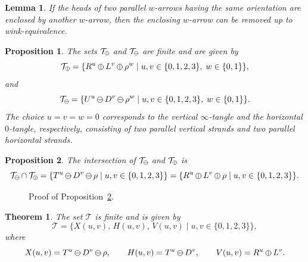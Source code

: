 \documentclass[10pt,a4paper]{amsart}
\newtheorem{lem}{Lemma}
\newtheorem{prop}{Proposition}
\newtheorem{thm}{Theorem}
\newcommand{\hstack}{
  \mathbin{
    \tikz[baseline=-0.582ex]
      \draw[line width=.1ex, line cap=round]
        (0,0) circle (.75ex)
        (-.5ex,0) -- (.5ex,0);
  }
}
\newcommand{\subhstack}{
  \mathbin{
    \tikz[baseline=-0.449ex]
      \draw[line width=.075ex,line cap=round]
        (0,0) circle (.5625ex)
        (-.375ex,0)--(.375ex,0);
  }
}
\newcommand{\subvstack}{
  \mathbin{
    \tikz[baseline=-0.449ex]
      \draw[line width=.075ex,line cap=round]
        (0,0) circle (.5625ex)
        (0,-.375ex)--(0,.375ex);
  }
}
\newcommand{\vstack}{
  \mathbin{
    \tikz[baseline=-0.582ex]
      \draw[line width=.1ex, line cap=round]
        (0,0) circle (.75ex)
        (0,-.5ex) -- (0,.5ex);
  }
}
\begin{document}
\begin{lem}\label{lemarrowsquareenclosed}
If the heads of two parallel $w$-arrows having the same orientation are enclosed by another $w$-arrow, then the enclosing $w$-arrow can be removed up to wink-equivalence.
\end{lem}

\begin{prop}\label{proptanglesets}
The sets $\mathcal{T}_{\subvstack}$ and $\mathcal{T}_{\subhstack}$ are finite and are given by
\[
\mathcal{T}_{\subvstack}
=
\{R^u \vstack L^v \vstack \rho^w \mid u,v\in\{0,1,2,3\},\; w\in\{0,1\}\},
\]
and
\[
\mathcal{T}_{\subhstack}
=
\{U^u \hstack D^v \hstack \rho^w \mid u,v\in\{0,1,2,3\},\; w\in\{0,1\}\}.
\]
The choice $u=v=w=0$ corresponds to the vertical $\infty$-tangle and the horizontal $0$-tangle, respectively, consisting of two parallel vertical strands and two parallel horizontal strands.
\end{prop}

\begin{prop}\label{proptantglesetintersection}
The intersection of $\mathcal{T}_{\subhstack}$ and $\mathcal{T}_{\subvstack}$ is
\[
\mathcal{T}_{\subhstack}\cap\mathcal{T}_{\subvstack}
=
\{T^u \hstack D^v \hstack \rho \mid u,v\in\{0,1,2,3\}\}
=
\{R^u \vstack L^v \vstack \rho \mid u,v\in\{0,1,2,3\}\}
.
\]
\end{prop}

\begin{figure}[!htbp]
\centering

\caption{Proof of Proposition~\ref{proptantglesetintersection}.}
\label{figproptantglesetintersection}
\end{figure}

\begin{thm}\label{thmtangleset}
The set $\mathcal{T}$ is finite and is given by
\[
\mathcal{T}
=
\{X(u,v),\,H(u,v),\,V(u,v)
\mid u,v\in\{0,1,2,3\}\},
\]
where
\[
X(u,v)=T^u \hstack D^v \hstack \rho,
\qquad
H(u,v)=T^u \hstack D^v,
\qquad
V(u,v)=R^u \vstack L^v.
\]
\end{thm}
\end{document}
